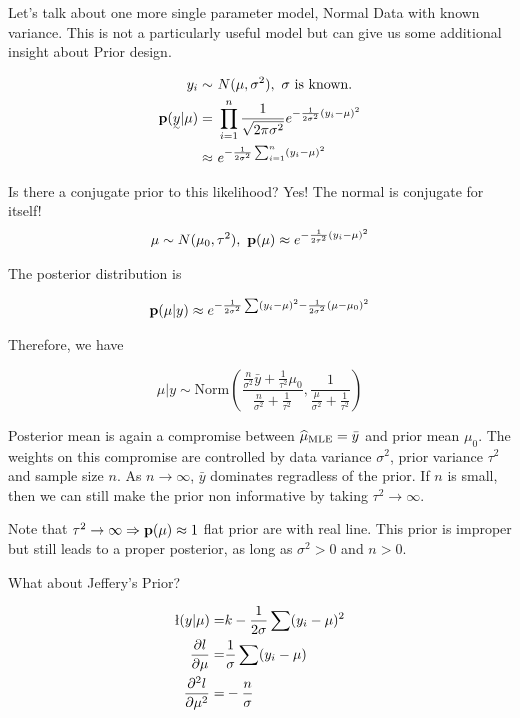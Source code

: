 Let's talk about one more single parameter model, Normal Data with known variance. This is not a particularly useful model but can give us some additional insight about Prior design.

\begin{align*}
    y_i 
    \sim&~ N(\mu, \sigma^2), ~\text{$\sigma$ is known}.\\
    \p(\vec{y}| \mu) 
    =&~ \prod_{i=1}^n \frac{1}{\sqrt{2\pi \sigma^2}} e^{-\frac{1}{2\sigma^2} (y_i - \mu)^2} \\
    \approx&~ e^{-\frac{1}{2\sigma^2} \sum_{i=1}^{n} (y_i - \mu)^2}
\end{align*}

Is there a conjugate prior to this likelihood? Yes! The normal is conjugate for itself!
\begin{align*}
    \mu \sim N(\mu_0, \tau^2), ~{\mathbf p}(\mu) \approx e^{-\frac{1}{2\tau^2} (y_i - \mu)^2}
\end{align*}

The posterior distribution is

\[
{\mathbf p}(\mu | y) \approx e^{-\frac{1}{2\sigma^2} \sum (y_i - \mu)^2 - \frac{1}{2\sigma^2} (\mu - \mu_0)^2}
\]

Therefore, we have

\[
\mu|y \sim \text{Norm}(\frac{\frac{n}{\sigma^2} \bar{y} + \frac{1}{\tau^2} \mu_0}{\frac{n}{\sigma^2} + \frac{1}{\tau^2}}, \frac{1}{\frac{\mu}{\sigma^2} + \frac{1}{\tau^2}})
\]

Posterior mean is again a compromise between $\widehat \mu_{\text{MLE}} = \bar{y}$ and prior mean $\mu_0$. The weights on this compromise are controlled by data variance $\sigma^2$, prior variance $\tau^2$ and sample size $n$. As $n \rightarrow \infty$, $\bar{y}$ dominates regradless of the prior. If $n$ is small, then we can still make the prior non informative by taking $\tau^2 \rightarrow \infty$.

Note that $\tau^2 \rightarrow \infty \Rightarrow {\mathbf p}(\mu) \approx 1$ flat prior are with real line. This prior is improper but still leads to a proper posterior, as long as $\sigma^2 > 0$ and $n > 0$.

What about Jeffery's Prior?

\begin{align*}
    \l(y| \mu) =& k - \frac{1}{2\sigma} \sum(y_i - \mu)^2\\
    \pdv{l}{\mu} =& \frac{1}{\sigma} \sum(y_i - \mu)\\
    \pdv[2]{l}{\mu} =& - \frac{n}{\sigma}
\end{align*}

